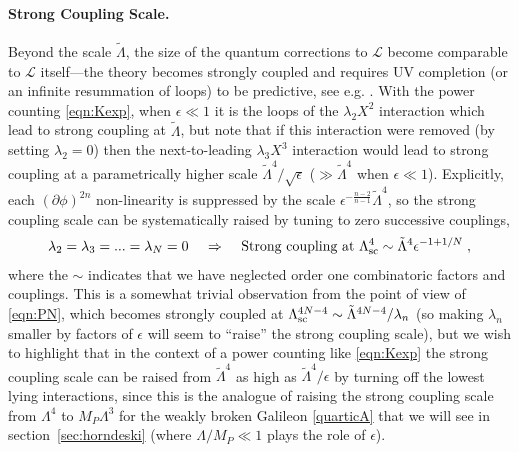 \documentclass[11pt]{article}
\newcommand{\LambdaP}{\tilde{\Lambda}}
\begin{document}
\paragraph{Strong Coupling Scale.}
Beyond the scale $\LambdaP$, the size of the quantum corrections to $\mathcal{L}$ become comparable to $\mathcal{L}$ itself---the theory becomes strongly coupled and requires UV completion (or an infinite resummation of loops) to be predictive, see e.g. \cite{deRham:2014wfa}.
With the power counting \eqref{eqn:Kexp}, when $\epsilon \ll 1$ it is the loops of the $\lambda_2 X^2$ interaction which lead to strong coupling at $\LambdaP$, but note that if this interaction were removed (by setting $\lambda_2 = 0$) then the next-to-leading $\lambda_3 X^3$ interaction would lead to strong coupling at a parametrically higher scale $\LambdaP^4 / \sqrt{\epsilon}$ ($\gg \LambdaP^4$ when $\epsilon \ll 1$). 
Explicitly, each $(\partial \phi)^{2n}$ non-linearity is suppressed by the scale $\epsilon^{- \frac{n-2}{n-1}} \LambdaP^4$, so the strong coupling scale can be systematically raised by tuning to zero successive couplings,
\begin{align}
 \lambda_2 = \lambda_3 = ... = \lambda_{N} = 0 \;\;\;\; \Rightarrow \;\;\;\; \text{Strong coupling at } \Lambda_{\rm sc}^4 \sim  \LambdaP^4 \epsilon^{- 1 + 1/N } \; ,   
 \label{eqn:KRaise}
\end{align} 
where the $\sim$ indicates that we have neglected order one combinatoric factors and couplings. 
This is a somewhat trivial observation from the point of view of \eqref{eqn:PN}, which becomes strongly coupled at $\Lambda_{\rm sc}^{4N-4} \sim \LambdaP^{4N-4} / \lambda_n$ (so making $\lambda_n$ smaller by factors of $\epsilon$ will seem to ``raise'' the strong coupling scale), but we wish to highlight that in the context of a power counting like \eqref{eqn:Kexp} the strong coupling scale can be raised from $\LambdaP^4$ as high as $\LambdaP^4 / \epsilon$ by turning off the lowest lying interactions, since this is the analogue of raising the strong coupling scale from $\Lambda^4$ to $M_P \Lambda^3$ for the weakly broken Galileon \eqref{quarticA} that we will see in section~\ref{sec:horndeski} (where $\Lambda/M_P \ll 1$ plays the role of $\epsilon$). 


\end{document}

